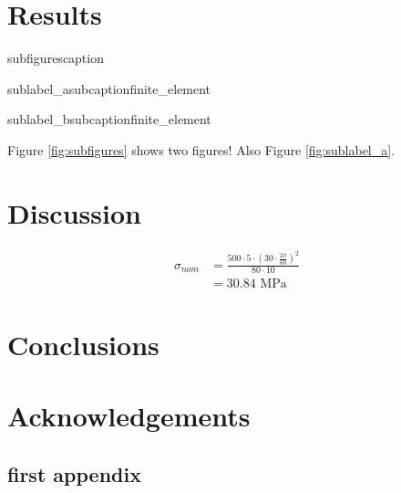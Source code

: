 \documentclass[12pt]{labreport}
\begin{document}
\section{Results}

\begin{img}{subfigures}{caption}
    \begin{subimg}[0.45\textwidth]{sublabel_a}{subcaption}{finite_element}
    \end{subimg}
    \hfill
    \begin{subimg}[0.45\textwidth]{sublabel_b}{subcaption}{finite_element}
    \end{subimg}
\end{img}

Figure \ref{fig:subfigures} shows two figures! Also Figure \ref{fig:sublabel_a}.

\section{Discussion}
\begin{equation}
\begin{split}
    \sigma_{nom} & = \frac{500\cdot5\cdot(30\cdot\frac{2\pi}{60})^2}{80\cdot10} \\
                 & = 30.84 \text{ MPa}
\end{split}
\end{equation}

\section{Conclusions}

\section{Acknowledgements}



\backmatter
\begin{appendices}
\appendix
{}
\section{first appendix}

    
\end{appendices}
\end{document}
